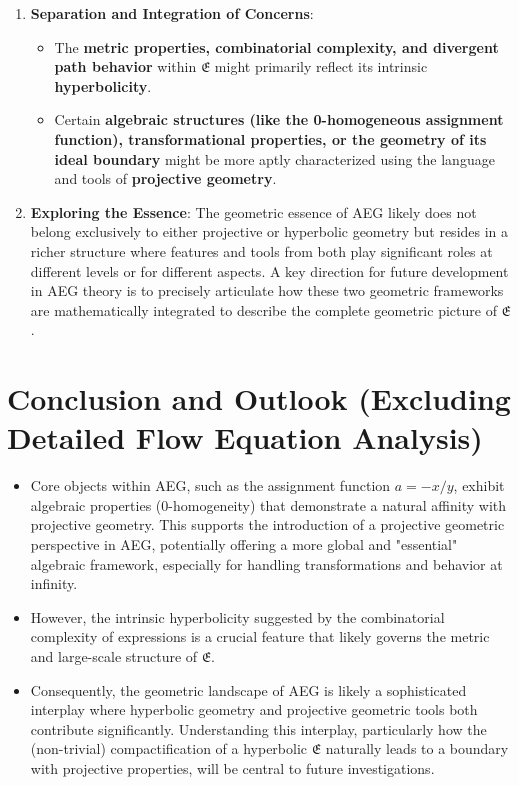\documentclass{article}
\begin{document}
\begin{itemize}
\begin{enumerate}
        \item \textbf{Separation and Integration of Concerns}:
        \begin{itemize}
            \item The \textbf{metric properties, combinatorial complexity, and divergent path behavior} within $\mathfrak{E}$ might primarily reflect its intrinsic \textbf{hyperbolicity}.
            \item Certain \textbf{algebraic structures (like the 0-homogeneous assignment function), transformational properties, or the geometry of its ideal boundary} might be more aptly characterized using the language and tools of \textbf{projective geometry}.
        \end{itemize}
        \item \textbf{Exploring the Essence}: The geometric essence of AEG likely does not belong exclusively to either projective or hyperbolic geometry but resides in a richer structure where features and tools from both play significant roles at different levels or for different aspects. A key direction for future development in AEG theory is to precisely articulate how these two geometric frameworks are mathematically integrated to describe the complete geometric picture of $\mathfrak{E}$.
    \end{enumerate}
\end{itemize}

\section{Conclusion and Outlook (Excluding Detailed Flow Equation Analysis)}
\begin{itemize}
    \item Core objects within AEG, such as the assignment function $a=-x/y$, exhibit algebraic properties (0-homogeneity) that demonstrate a natural affinity with projective geometry. This supports the introduction of a projective geometric perspective in AEG, potentially offering a more global and "essential" algebraic framework, especially for handling transformations and behavior at infinity.
    \item However, the intrinsic hyperbolicity suggested by the combinatorial complexity of expressions is a crucial feature that likely governs the metric and large-scale structure of $\mathfrak{E}$.
    \item Consequently, the geometric landscape of AEG is likely a sophisticated interplay where hyperbolic geometry and projective geometric tools both contribute significantly. Understanding this interplay, particularly how the (non-trivial) compactification of a hyperbolic $\mathfrak{E}$ naturally leads to a boundary with projective properties, will be central to future investigations.
\end{itemize}
\end{document}
